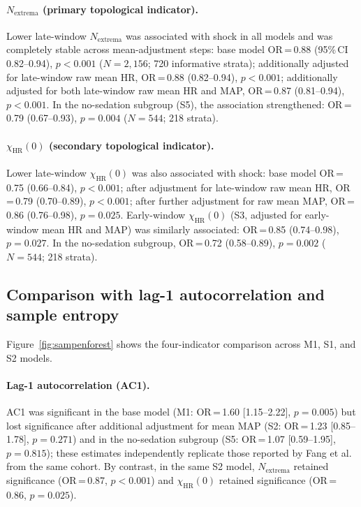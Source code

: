 \documentclass[12pt,a4paper]{article}
\begin{document}
\paragraph{$N_{\text{extrema}}$ (primary topological indicator).}
Lower late-window $N_{\text{extrema}}$ was associated with shock in
all models and was completely stable across mean-adjustment steps:
base model OR\,=\,0.88 (95\%\,CI 0.82--0.94), $p<0.001$
($N=2{,}156$; 720 informative strata);
additionally adjusted for late-window raw mean HR,
OR\,=\,0.88 (0.82--0.94), $p<0.001$;
additionally adjusted for both late-window raw mean HR and MAP,
OR\,=\,0.87 (0.81--0.94), $p<0.001$.
In the no-sedation subgroup (S5), the association strengthened:
OR\,=\,0.79 (0.67--0.93), $p=0.004$ ($N=544$; 218 strata).

\paragraph{$\chi_{\text{HR}}(0)$ (secondary topological indicator).}
Lower late-window $\chi_{\text{HR}}(0)$ was also associated with shock:
base model OR\,=\,0.75 (0.66--0.84), $p<0.001$;
after adjustment for late-window raw mean HR, OR\,=\,0.79 (0.70--0.89),
$p<0.001$;
after further adjustment for raw mean MAP, OR\,=\,0.86 (0.76--0.98),
$p=0.025$.
Early-window $\chi_{\text{HR}}(0)$ (S3, adjusted for early-window mean
HR and MAP) was similarly associated: OR\,=\,0.85 (0.74--0.98),
$p=0.027$.
In the no-sedation subgroup, OR\,=\,0.72 (0.58--0.89), $p=0.002$
($N=544$; 218 strata).

\subsection{Comparison with lag-1 autocorrelation and sample entropy}
\label{sec:res-comparators}

Figure~\ref{fig:sampenforest} shows the four-indicator comparison across
M1, S1, and S2 models.

\paragraph{Lag-1 autocorrelation (AC1).}
AC1 was significant in the base model (M1: OR\,=\,1.60 [1.15--2.22],
$p=0.005$) but lost significance after additional adjustment for
mean MAP (S2: OR\,=\,1.23 [0.85--1.78], $p=0.271$) and in the
no-sedation subgroup (S5: OR\,=\,1.07 [0.59--1.95], $p=0.815$);
these estimates independently replicate those reported by Fang et al.\
\cite{fang2026} from the same cohort.
By contrast, in the same S2 model, $N_{\text{extrema}}$ retained
significance (OR\,=\,0.87, $p<0.001$) and $\chi_{\text{HR}}(0)$
retained significance (OR\,=\,0.86, $p=0.025$).
\end{document}
